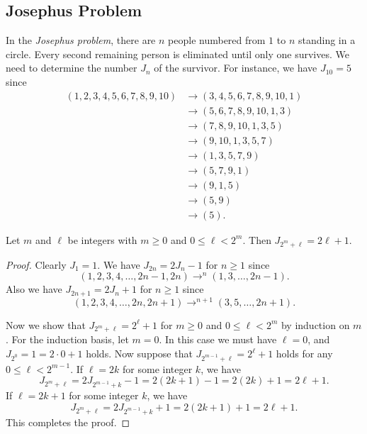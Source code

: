 \documentclass[11pt]{article}
\begin{document}
\subsection{Josephus Problem}
In the \emph{Josephus problem}, there are $n$ people numbered from $1$ to $n$ standing in a circle.
Every second remaining person is eliminated until only one survives.
We need to determine the number $J_n$ of the survivor.
For instance, we have $J_{10} = 5$ since
\begin{align*}
  (1, 2, 3, 4, 5, 6, 7, 8, 9, 10)
  &\to (3, 4, 5, 6, 7, 8, 9, 10, 1) \\
  &\to (5, 6, 7, 8, 9, 10, 1, 3) \\
  &\to (7, 8, 9, 10, 1, 3, 5) \\
  &\to (9, 10, 1, 3, 5, 7) \\
  &\to (1, 3, 5, 7, 9) \\
  &\to (5, 7, 9, 1) \\
  &\to (9, 1, 5) \\
  &\to (5, 9) \\
  &\to (5).
\end{align*}

\begin{theorem}
  Let $m$ and $\ell$ be integers with $m \geq 0$ and $0 \leq \ell < 2^m$.
  Then $J_{2^m + \ell} = 2\ell + 1$.
\end{theorem}
\begin{proof}
  Clearly $J_1 = 1$.
  We have $J_{2n} = 2J_n - 1$ for $n \geq 1$ since
  \begin{equation*}
    (1, 2, 3, 4, \dots, 2n-1, 2n) \to^n (1, 3, \dots, 2n-1).
  \end{equation*}
  Also we have $J_{2n+1} = 2J_n + 1$ for $n \geq 1$ since
  \begin{equation*}
    (1, 2, 3, 4, \dots, 2n, 2n+1) \to^{n+1} (3, 5, \dots, 2n+1).
  \end{equation*}
  \par Now we show that $J_{2^m + \ell} = 2^\ell + 1$ for $m \geq 0$ and $0 \leq \ell < 2^m$ by induction on $m$.
  For the induction basis, let $m = 0$.
  In this case we must have $\ell = 0$, and $J_{2^0} = 1 = 2 \cdot 0 + 1$ holds.
  Now suppose that $J_{2^{m-1} + \ell} = 2^\ell + 1$ holds for any $0 \leq \ell < 2^{m-1}$.
  If $\ell = 2k$ for some integer $k$, we have
  \begin{equation*}
    J_{2^m + \ell}
    = 2J_{2^{m-1} + k} - 1
    = 2(2k + 1) - 1
    = 2(2k) + 1
    = 2\ell + 1.
  \end{equation*}
  If $\ell = 2k + 1$ for some integer $k$, we have
  \begin{equation*}
    J_{2^m + \ell}
    = 2J_{2^{m-1} + k} + 1
    = 2(2k + 1) + 1
    = 2\ell + 1.
  \end{equation*}
  This completes the proof.
\end{proof}
\end{document}
